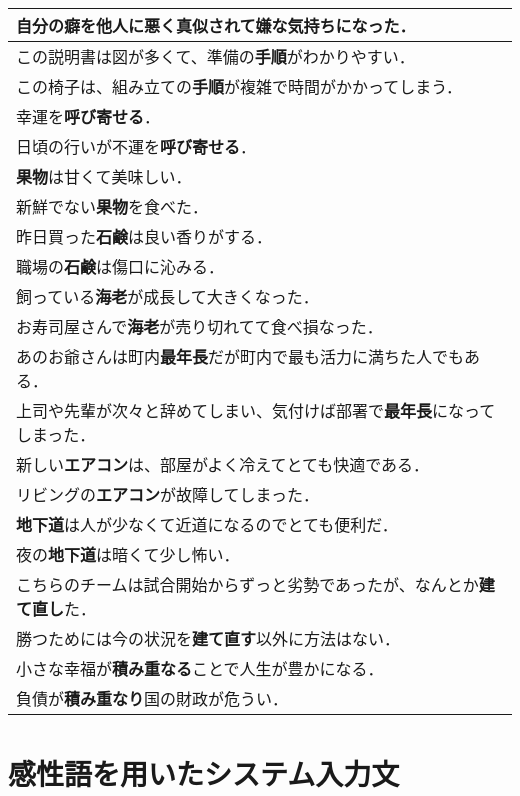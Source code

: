 \begin{longtable}[C]{|l|}
		\hline
		自分の癖を他人に悪く\textbf{真似}されて嫌な気持ちになった．	\\
		\hline
		この説明書は図が多くて、準備の\textbf{手順}がわかりやすい．	\\
		\hline
		この椅子は、組み立ての\textbf{手順}が複雑で時間がかかってしまう．	\\
		\hline
		幸運を\textbf{呼び寄せる}．	\\
		\hline
		日頃の行いが不運を\textbf{呼び寄せる}．	\\
		\hline
		\textbf{果物}は甘くて美味しい．	\\
		\hline
		新鮮でない\textbf{果物}を食べた．	\\
		\hline
		昨日買った\textbf{石鹸}は良い香りがする．	\\
		\hline
		職場の\textbf{石鹸}は傷口に沁みる．	\\
		\hline
		飼っている\textbf{海老}が成長して大きくなった．	\\
		\hline
		お寿司屋さんで\textbf{海老}が売り切れてて食べ損なった．	\\
		\hline
		あのお爺さんは町内\textbf{最年長}だが町内で最も活力に満ちた人でもある．	\\
		\hline
		上司や先輩が次々と辞めてしまい、気付けば部署で\textbf{最年長}になってしまった．	\\
		\hline
		新しい\textbf{エアコン}は、部屋がよく冷えてとても快適である．	\\
		\hline
		リビングの\textbf{エアコン}が故障してしまった．	\\
		\hline
		\textbf{地下道}は人が少なくて近道になるのでとても便利だ．	\\
		\hline
		夜の\textbf{地下道}は暗くて少し怖い．	\\
		\hline
		こちらのチームは試合開始からずっと劣勢であったが、なんとか\textbf{建て直し}た．	\\
		\hline
		勝つためには今の状況を\textbf{建て直す}以外に方法はない．	\\
		\hline
		小さな幸福が\textbf{積み重なる}ことで人生が豊かになる．	\\
		\hline
		負債が\textbf{積み重なり}国の財政が危うい．	\\
		\hline		
\end{longtable}

\newpage
\section{感性語を用いたシステム入力文}

